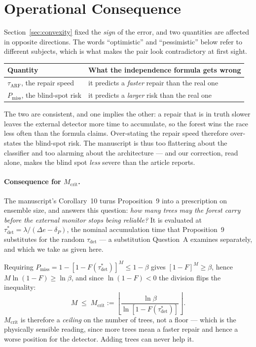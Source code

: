 \documentclass[11pt,a4paper]{article}
\begin{document}
\section{Operational Consequence}

Section~\ref{sec:convexity} fixed the \emph{sign} of the error, and two quantities are
affected in opposite directions. The words ``optimistic'' and ``pessimistic'' below refer
to different subjects, which is what makes the pair look contradictory at first sight.

\begin{center}
\begin{tabular}{@{}ll@{}}
\toprule
Quantity & What the independence formula gets wrong \\
\midrule
$\tau_{\mathrm{ARF}}$, the repair speed & it predicts a \emph{faster} repair than the real one \\
$P_{\mathrm{miss}}$, the blind-spot risk & it predicts a \emph{larger} risk than the real one \\
\bottomrule
\end{tabular}
\end{center}

\noindent The two are consistent, and one implies the other: a repair that is in truth
slower leaves the external detector more time to accumulate, so the forest wins the race
less often than the formula claims. Over-stating the repair speed therefore over-states
the blind-spot risk. The manuscript is thus too flattering about the classifier and too
alarming about the architecture --- and our correction, read alone, makes the blind spot
\emph{less} severe than the article reports.

\paragraph{Consequence for $M_{\mathrm{crit}}$.} The manuscript's Corollary~10 turns
Proposition~9 into a prescription on ensemble size, and answers this question: \emph{how
many trees may the forest carry before the external monitor stops being reliable?} It is
evaluated at $\tau^*_{\mathrm{det}} = \lambda/(\Delta e - \delta_P)$, the nominal
accumulation time that Proposition~9 substitutes for the random $\tau_{\mathrm{det}}$ ---
a substitution Question~A examines separately, and which we take as given here.

Requiring
$P_{\mathrm{miss}} = 1 - [1-F(\tau^*_{\mathrm{det}})]^M \le 1-\beta$ gives
$[1-F]^M \ge \beta$, hence $M \ln(1-F) \ge \ln\beta$, and since $\ln(1-F) < 0$ the
division flips the inequality:
\[
  M \;\le\; M_{\mathrm{crit}} := \left\lfloor \frac{\ln\beta}{\ln[1-F(\tau^*_{\mathrm{det}})]} \right\rfloor .
\]
$M_{\mathrm{crit}}$ is therefore a \emph{ceiling} on the number of trees, not a floor ---
which is the physically sensible reading, since more trees mean a faster repair and hence
a worse position for the detector. Adding trees can never help it.
\end{document}

